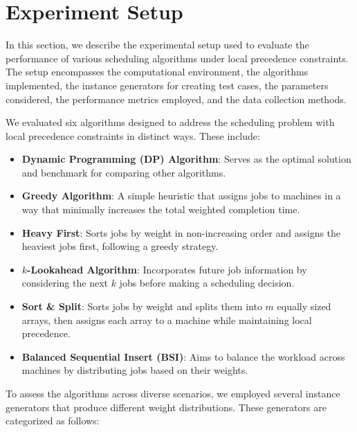 \section{Experiment Setup} \label{sec:experiment_setup}

In this section, we describe the experimental setup used to evaluate the performance of various scheduling algorithms under local precedence constraints. The setup encompasses the computational environment, the algorithms implemented, the instance generators for creating test cases, the parameters considered, the performance metrics employed, and the data collection methods.

We evaluated six algorithms designed to address the scheduling problem with local precedence constraints in distinct ways. These include:

\begin{itemize}
    \item \textbf{Dynamic Programming (DP) Algorithm}: Serves as the optimal solution and benchmark for comparing other algorithms.
    \item \textbf{Greedy Algorithm}: A simple heuristic that assigns jobs to machines in a way that minimally increases the total weighted completion time.
    \item \textbf{Heavy First}: Sorts jobs by weight in non-increasing order and assigns the heaviest jobs first, following a greedy strategy.
    \item \textbf{$k$-Lookahead Algorithm}: Incorporates future job information by considering the next $k$ jobs before making a scheduling decision.
    \item \textbf{Sort \& Split}: Sorts jobs by weight and splits them into $m$ equally sized arrays, then assigns each array to a machine while maintaining local precedence.
    \item \textbf{Balanced Sequential Insert (BSI)}: Aims to balance the workload across machines by distributing jobs based on their weights.
\end{itemize}

To assess the algorithms across diverse scenarios, we employed several instance generators that produce different weight distributions. These generators are categorized as follows:

